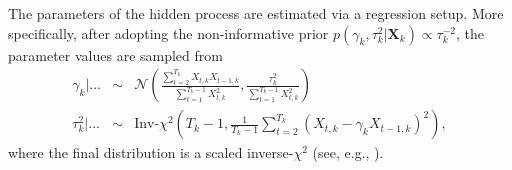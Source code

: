 \documentclass[aoas, preprint]{imsart}
\numberwithin{equation}{section}
\theoremstyle{plain}
\begin{document}
\begin{center}
\end{center}
The parameters of the hidden process are estimated via a regression setup. More specifically, after adopting the non-informative prior $p(\gamma_k, \tau_k^2 | \boldsymbol{X}_k) \propto \tau_k^{-2}$, the parameter values are sampled from
\begin{eqnarray*}
\gamma_k | \dots  &\sim&  \mathcal{N} \left( \frac{\sum_{t=2}^{T_k} X_{t,k}X_{t-1,k}}{\sum_{t=1}^{T_k-1} X_{t,k}^2} , \frac{\tau_k^2}{\sum_{t=1}^{T_k-1} X_{t,k}^2} \right)\\
\tau_k^2 | \dots &\sim& \text{Inv-}\chi^2 \left(T_k-1, \frac{1}{T_k-1} \sum_{t=2}^{T_k} \left(X_{t,k} - \gamma_k X_{t-1,k} \right)^2 \right),
\end{eqnarray*}
where the final distribution is a scaled inverse-$\chi^2$ (see, e.g., \citet{gelman2003bayesian}).



\end{document}
